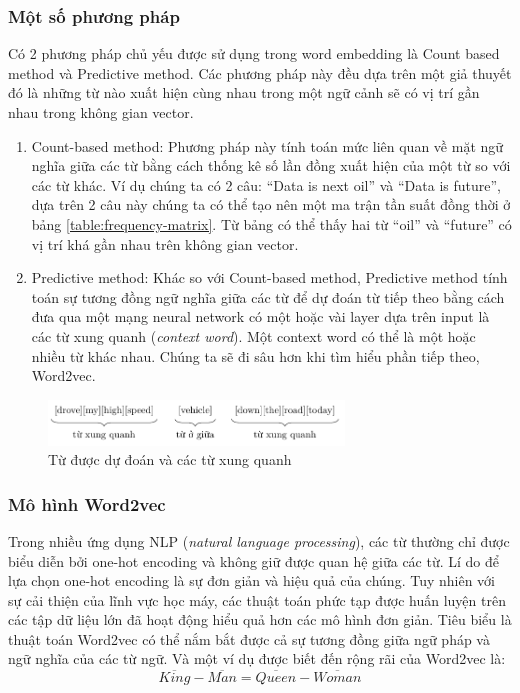 \subsubsection{Một số phương pháp}
Có 2 phương pháp chủ yếu được sử dụng trong word embedding là Count based method và Predictive method. Các phương pháp này đều dựa trên một giả thuyết đó là những từ nào xuất hiện cùng nhau trong một ngữ cảnh sẽ có vị trí gần nhau trong không gian vector. \cite{webpage12}
\begin{enumerate}
    \item Count-based method: Phương pháp này tính toán mức liên quan về mặt ngữ nghĩa giữa các từ bằng cách thống kê số lần đồng xuất hiện của một từ so với các từ khác. Ví dụ chúng ta có 2 câu: ``Data is next oil'' và ``Data is future'', dựa trên 2 câu này chúng ta có thể tạo nên một ma trận tần suất đồng thời ở bảng \ref{table:frequency-matrix}. Từ bảng có thể thấy hai từ ``oil'' và ``future'' có vị trí khá gần nhau trên không gian vector.
    \item Predictive method: Khác so với Count-based method, Predictive method tính toán sự tương đồng ngữ nghĩa giữa các từ để dự đoán từ tiếp theo bằng cách đưa qua một mạng neural network có một hoặc vài layer dựa trên input là các từ xung quanh (\textit{context word}). Một context word có thể là một hoặc nhiều từ khác nhau. Chúng ta sẽ đi sâu hơn khi tìm hiểu phần tiếp theo, Word2vec.
\end{enumerate}

\begin{figure}[htb]
    \centering
    \includegraphics[width=0.7\textwidth]{tikz_image/predictive_method.pdf}
    \caption{Từ được dự đoán và các từ xung quanh}
    \label{figure:predictive-method}
\end{figure}

\subsubsection{Mô hình Word2vec}
Trong nhiều ứng dụng NLP (\textit{natural language processing}), các từ thường chỉ được biểu diễn bởi one-hot encoding và không giữ được quan hệ giữa các từ. Lí do để lựa chọn one-hot encoding là sự đơn giản và hiệu quả của chúng. \cite{Aggarwal2022-xj} Tuy nhiên với sự cải thiện của lĩnh vực học máy, các thuật toán phức tạp được huấn luyện trên các tập dữ liệu lớn đã hoạt động hiểu quả hơn các mô hình đơn giản. Tiêu biểu là thuật toán Word2vec có thể nắm bắt được cả sự tương đồng giữa ngữ pháp và ngữ nghĩa của các từ ngữ. Và một ví dụ được biết đến rộng rãi của Word2vec là:
\[
    \overline{King}-\overline{Man}=\overline{Queen}-\overline{Woman}
\]

